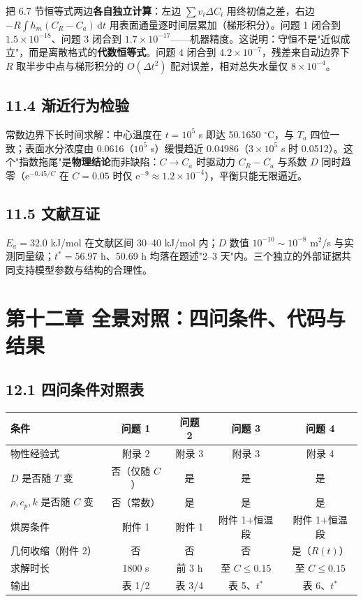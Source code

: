\documentclass[12pt,a4paper]{ctexart}
\newcommand{\dd}{\,\mathrm{d}}
\begin{document}
把 6.7 节恒等式两边\textbf{各自独立计算}：左边 $\sum v_i\Delta C_i$ 用终初值之差，右边 $-R\int h_m(C_R-C_a)\dd t$ 用表面通量逐时间层累加（梯形积分）。问题 1 闭合到 $1.5\times10^{-18}$、问题 3 闭合到 $1.7\times10^{-17}$——机器精度。这说明：守恒不是"近似成立"，而是离散格式的\textbf{代数恒等式}。问题 4 闭合到 $4.2\times10^{-7}$，残差来自动边界下 $R$ 取半步中点与梯形积分的 $O(\Delta t^2)$ 配对误差，相对总失水量仅 $8\times10^{-4}$。

\subsection{11.4 渐近行为检验}

常数边界下长时间求解：中心温度在 $t=10^5$ s 即达 50.1650 $^\circ$C，与 $T_a$ 四位一致；表面水分浓度由 0.0616（$10^5$ s）缓慢趋近 0.04986（$3\times10^5$ s 时 0.0512）。这个"指数拖尾"是\textbf{物理结论}而非缺陷：$C\to C_a$ 时驱动力 $C_R-C_a$ 与系数 $D$ 同时趋零（$\mathrm{e}^{-0.45/C}$ 在 $C=0.05$ 时仅 $\mathrm{e}^{-9}\approx1.2\times10^{-4}$），平衡只能无限逼近。

\subsection{11.5 文献互证}

$E_a=32.0$ kJ/mol 在文献区间 30--40 kJ/mol 内；$D$ 数值 $10^{-10}\sim10^{-8}$ m$^2$/s 与实测同量级；$t^*=56.97$ h、50.69 h 均落在题述"2--3 天"内。三个独立的外部证据共同支持模型参数与结构的合理性。

\section{第十二章 全景对照：四问条件、代码与结果}

\subsection{12.1 四问条件对照表}

\begin{center}
{\begin{tabular}{lcccc}
\toprule
条件 & 问题 1 & 问题 2 & 问题 3 & 问题 4 \\
\midrule
物性经验式 & 附录 2 & 附录 3 & 附录 3 & 附录 4 \\
$D$ 是否随 $T$ 变 & 否（仅随 $C$） & 是 & 是 & 是 \\
$\rho,c_p,k$ 是否随 $C$ 变 & 否（常数） & 是 & 是 & 是 \\
烘房条件 & 附件 1 & 附件 1 & 附件 1$+$恒温段 & 附件 1$+$恒温段 \\
几何收缩（附件 2） & 否 & 否 & 否 & 是（$R(t)$） \\
求解时长 & 1800 s & 前 3 h & 至 $C\le0.15$ & 至 $C\le0.15$ \\
输出 & 表 1/2 & 表 3/4 & 表 5、$t^*$ & 表 6、$t^*$ \\
\bottomrule
\end{tabular}}
\end{center}
\end{document}
